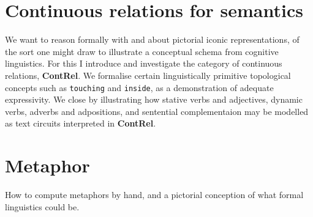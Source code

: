 \chapter{Continuous relations for semantics}\label{chapter:contrel}
We want to reason formally with and about pictorial iconic representations, of the sort one might draw to illustrate a conceptual schema from cognitive linguistics. For this I introduce and investigate the category of continuous relations, \textbf{ContRel}. We formalise certain linguistically primitive topological concepts such as \texttt{touching} and \texttt{inside}, as a demonstration of adequate expressivity. We close by illustrating how stative verbs and adjectives, dynamic verbs, adverbs and adpositions, and sentential complementaion may be modelled as text circuits interpreted in \textbf{ContRel}.
\clearpage
\newpage

\clearpage
\newpage

\clearpage
\newpage

\clearpage
\newpage

\clearpage
\newpage
\label{sec:topconcepts}
\clearpage
\newpage


\clearpage
\newpage
\chapter{Metaphor}\label{chapter:conclusion}
How to compute metaphors by hand, and a pictorial conception of what formal linguistics could be.
\clearpage
\newpage
\label{sec:metaphor}








